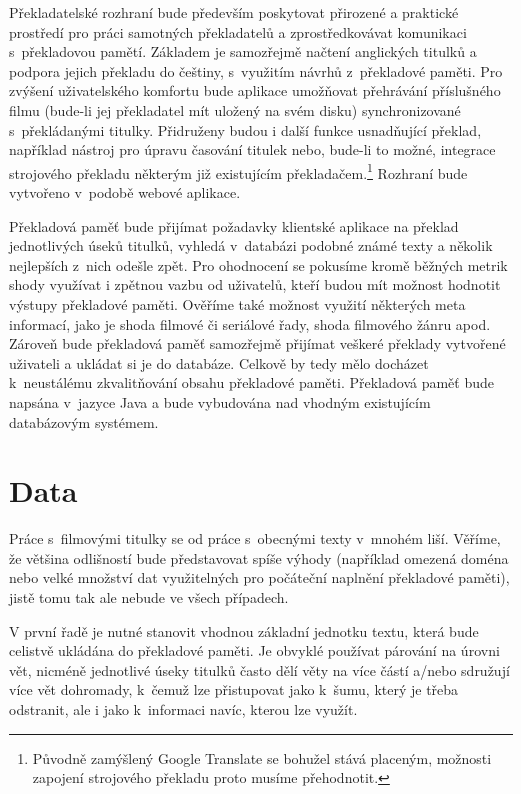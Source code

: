 Překladatelské rozhraní bude především poskytovat přirozené a praktické prostředí pro práci samotných překladatelů a zprostředkovávat komunikaci s~překladovou pamětí. Základem je samozřejmě načtení anglických titulků a podpora jejich překladu do češtiny, s~využitím návrhů z~překladové paměti. Pro zvýšení uživatelského komfortu bude aplikace umožňovat přehrávání příslušného filmu (bude-li jej překladatel mít uložený na svém disku) synchronizované s~pře\-klá\-da\-ný\-mi titulky. Přidruženy budou i další funkce usnadňující překlad, například nástroj pro úpravu časování titulek nebo, bude-li to možné, integrace strojového překladu některým již existujícím překladačem.\footnote{Původně zamýšlený Google Translate se bohužel stává placeným, možnosti zapojení strojového překladu proto musíme přehodnotit.} Rozhraní bude vytvořeno v~podobě webové aplikace.


Překladová paměť bude přijímat požadavky klientské aplikace na překlad jednotlivých úseků titulků, vyhledá v~databázi podobné známé texty a několik nejlepších z~nich odešle zpět. Pro ohodnocení se pokusíme kromě běžných metrik shody využívat i zpětnou vazbu od uživatelů, kteří budou mít možnost hodnotit výstupy překladové paměti. Ověříme také možnost využití některých meta informací, jako je shoda filmové či seriálové řady, shoda filmového žánru apod. Zároveň bude překladová paměť samozřejmě přijímat veškeré překlady vytvořené uživateli a ukládat si je do databáze. Celkově by tedy mělo docházet k~neustálému zkvalitňování obsahu překladové paměti. Překladová paměť bude napsána v~jazyce Java a bude vybudována nad vhodným existujícím databázovým systémem.

\section{Data}
Práce s~filmovými titulky se od práce s~obecnými texty v~mnohém liší. Věříme, že většina odlišností bude představovat spíše výhody (například omezená doména nebo velké množství dat využitelných pro počáteční naplnění překladové paměti), jistě tomu tak ale nebude ve všech případech.

V první řadě je nutné stanovit vhodnou základní jednotku textu, která bude celistvě ukládána do překladové paměti. Je obvyklé používat párování na úrovni vět, nicméně jednotlivé úseky titulků často dělí věty na více částí a/nebo sdružují více vět dohromady, k~čemuž lze přistupovat jako k~šumu, který je třeba odstranit, ale i jako k~informaci navíc, kterou lze využít.

